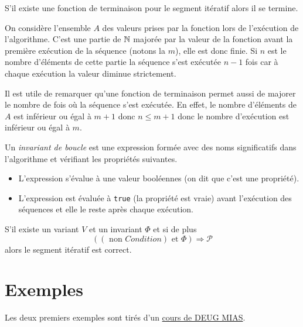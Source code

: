 \begin{prop}
  S'il existe une fonction de terminaison pour le segment itératif alors il se termine.
\end{prop}
\begin{demo}
  On considère l'ensemble $A$ des valeurs prises par la fonction lors de l'exécution de l'algorithme. C'est une partie de $\mathbb{N}$ majorée par la valeur de la fonction avant la première exécution de la séquence (notons la $m$), elle est donc finie. Si $n$ est le nombre d'éléments de cette partie la séquence s'est exécutée $n-1$ fois car à chaque exécution la valeur diminue strictement. 
\end{demo}
Il est utile de remarquer qu'une fonction de terminaison permet aussi de majorer le nombre de fois où la séquence s'est exécutée. En effet, le nombre d'éléments de $A$ est inférieur ou égal à $m+1$ donc $n\leq m+1$ donc le nombre d'exécution est inférieur ou égal à $m$.
\begin{defi}
  Un \emph{invariant de boucle} est une expression formée avec des noms significatifs dans l'algorithme et vérifiant les propriétés suivantes.
\begin{itemize}
  \item L'expression s'évalue à une valeur booléennes (on dit que c'est une propriété).
  \item L'expression est évaluée à \verb|true| (la propriété est vraie) avant l'exécution des séquences et elle le reste après chaque exécution.
\end{itemize}
\end{defi}
\begin{prop}
S'il existe un variant $V$ et un invariant $\Phi$ et si de plus
\begin{displaymath}
  \left( \left( \text{ non } Condition\right) \text{ et } \Phi \right) \Rightarrow \mathcal{P}
\end{displaymath}
alors le segment itératif est correct.
\end{prop}

\section{Exemples}
Les deux premiers exemples sont tirés d'un \href{http://prolland.free.fr/Cours/Cycle1/MIAS/MIAS2/Complexite/terminaison1.html}{cours de DEUG MIAS}. 
